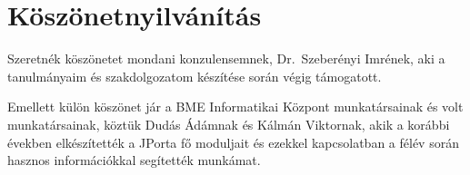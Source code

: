 \chapter*{Köszönetnyilvánítás}

Szeretnék köszönetet mondani konzulensemnek, Dr.~Szeberényi Imrének, aki a tanulmányaim és szakdolgozatom készítése során végig támogatott.

Emellett külön köszönet jár a BME Informatikai Központ munkatársainak és volt munkatársainak, köztük Dudás Ádámnak és Kálmán Viktornak, akik a korábbi években elkészítették a JPorta fő moduljait és ezekkel kapcsolatban a félév során hasznos információkkal segítették munkámat.